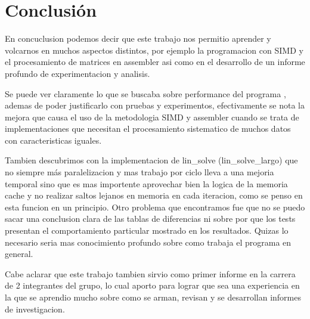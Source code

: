 \section{Conclusión}

En concuclusion podemos decir que este trabajo nos permitio aprender y volcarnos en muchos aspectos distintos,
por ejemplo la programacion con SIMD y el procesamiento de matrices en assembler asi como en el desarrollo
de un informe profundo de experimentacion y analisis.


Se puede ver claramente lo que se buscaba sobre performance del programa
, ademas de poder justificarlo con pruebas y experimentos,
efectivamente se nota la mejora que causa el uso de la metodologia SIMD y assembler cuando se trata de
implementaciones que necesitan el procesamiento sistematico de muchos datos con caracteristicas iguales.


Tambien descubrimos con la implementacion de lin_solve (lin_solve_largo)
que no siempre más paralelizacion y mas trabajo por ciclo lleva a una mejoria temporal
sino que es mas importente aprovechar bien la logica de la memoria cache y no realizar
saltos lejanos en memoria en cada iteracion, como se penso en esta funcion en un principio.
Otro problema que encontramos fue que no se puedo sacar una conclusion clara de las tablas de diferencias
ni sobre por que los tests presentan el comportamiento particular mostrado en los resultados.
Quizas lo necesario seria mas conocimiento profundo sobre como trabaja el programa en general.


Cabe aclarar que este trabajo tambien sirvio como primer informe en la carrera de 2 integrantes del grupo, lo cual
aporto para lograr que sea una experiencia en la que se aprendio mucho sobre como se arman, revisan
y se desarrollan informes de investigacion.
